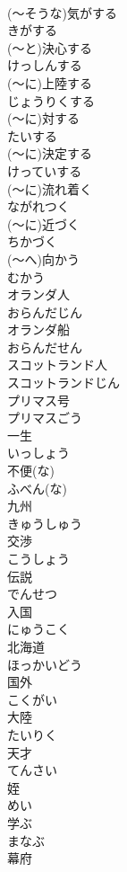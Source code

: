 \documentclass[8pt]{extreport}
\begin{document}
\begin{CJK}{UTF8}{min}
\\	(～そうな)気がする	
\\	きがする
\\	(～と)決心する	
\\	けっしんする
\\	(～に)上陸する	
\\	じょうりくする
\\	(～に)対する	
\\	たいする
\\	(～に)決定する	
\\	けっていする
\\	(～に)流れ着く	
\\	ながれつく
\\	(～に)近づく	
\\	ちかづく
\\	(～へ)向かう	
\\	むかう
\\	オランダ人	
\\	おらんだじん
\\	オランダ船	
\\	おらんだせん
\\	スコットランド人	
\\	スコットランドじん
\\	プリマス号	
\\	プリマスごう
\\	一生	
\\	いっしょう
\\	不便(な)	
\\	ふべん(な)
\\	九州	
\\	きゅうしゅう
\\	交渉	
\\	こうしょう
\\	伝説	
\\	でんせつ
\\	入国	
\\	にゅうこく
\\	北海道	
\\	ほっかいどう
\\	国外	
\\	こくがい
\\	大陸	
\\	たいりく
\\	天才	
\\	てんさい
\\	姪	
\\	めい
\\	学ぶ	
\\	まなぶ
\\	幕府	

\end{CJK}
\end{document}
